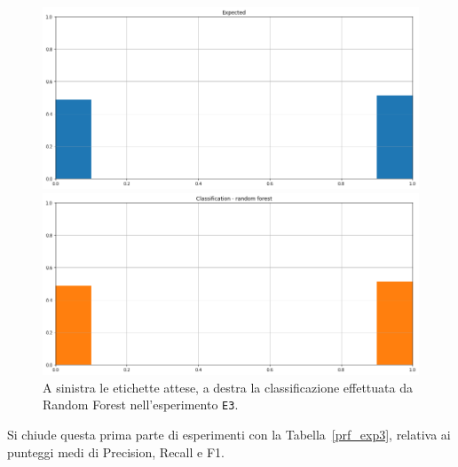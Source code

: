 \documentclass[12pt]{report}
\theoremstyle{definition}
\begin{document}
\begin{figure}
\centering
    \begin{minipage}{0.48\textwidth}
        \includegraphics[width=\linewidth]{images/experiment_beta05_disgiunti/expected_classification.png}
    \end{minipage}
    \begin{minipage}{0.48\textwidth}
        \includegraphics[width=\linewidth]{images/experiment_beta05_disgiunti/prediction_classification_rf.png}
    \end{minipage}
    \caption{A sinistra le etichette attese, a destra la classificazione effettuata da Random Forest nell'esperimento \texttt{E3}.}
    \label{rf_class_exp3}
\end{figure} 
Si chiude questa prima parte di esperimenti con la Tabella~\ref{prf_exp3}, relativa ai punteggi medi di Precision, Recall e F1.
\end{document}
